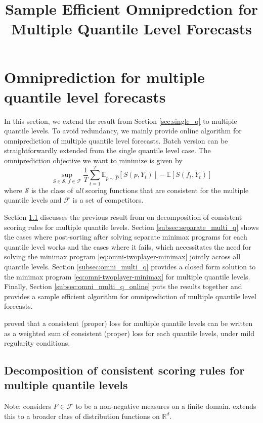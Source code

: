 \documentclass{article}
\newcommand{\E}{\mathbb{E}}
\newcommand{\R}{\mathbb{R}}
\newcommand{\cf}{\mathcal{F}}
\newcommand{\cs}{\mathcal{S}}
\begin{document}
\title{Sample Efficient Omnipredction for Multiple Quantile Level Forecasts}
\date{}
\author{}
\maketitle





\section{Omniprediction for multiple quantile level forecasts}\label{sec:multi_q}
In this section, we extend the result from Section \ref{sec:single_q} to multiple quantile levels. To avoid redundancy, we mainly provide online algorithm for omniprediction of multiple quantile level forecasts. Batch version can be straightforwardly extended from the single quantile level case. The omniprediction objective we want to minimize is given by
\[
\sup_{S \in \cs,\, f \in \cf} \frac{1}{T} \sum_{t=1}^T \E_{p \sim \hat{P}} [S(p, Y_t)] - \E[S(f_t, Y_t)]
\]
where $\cs$ is the class of \textit{all} scoring functions that are consistent for the multiple quantile levels and $\cf$ is a set of competitors.

Section \ref{subsec:decomp_multi_q} discusses the previous result from \cite{fissler2016multiq} on decomposition of consistent scoring rules for multiple quantile levels. Section \ref{subsec:separate_multi_q} shows the cases where post-sorting after solving separate minimax programs for each quantile level works and the cases where it fails, which necessitates the need for solving the minimax program \eqref{eq:omni-twoplayer-minimax} jointly across all quantile levels. Section \ref{subsec:omni_multi_q} provides a closed form solution to the minimax program \eqref{eq:omni-twoplayer-minimax} for multiple quantile levels. Finally, Section \ref{subsec:omni_multi_q_online} puts the results together and provides a sample efficient algorithm for omniprediction of multiple quantile level forecasts.

\cite{fissler2016multiq} proved that a consistent (proper) loss for multiple quantile levels can be written as a weighted sum of consistent (proper) loss for each quantile levels, under mild regularity conditions.


\subsection{Decomposition of consistent scoring rules for multiple quantile levels}\label{subsec:decomp_multi_q}
Note: \cite{osband1985} considers $F \in \cf$ to be a non-negative measures on a finite domain. \cite{fissler2016multiq} extends this to a broader class of distribution functions on $\R^d$.
\end{document}
